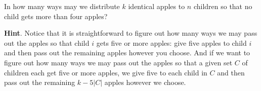 \documentclass{book}
\begin{document}
\setcounter{cpjt}{225}
\addtocounter{cpjt}{-1}
\begin{activity}\label{act_restrictedmultisetspie}
\hypertarget{p-1205}{}%
In how many ways may we distribute \(k\) identical apples to \(n\) children so that no child gets more than four apples?%
\par\smallskip%
\noindent\textbf{Hint}.\hypertarget{hint-145}{}\quad%
\hypertarget{p-1206}{}%
Notice that it is straightforward to figure out how many ways we may pass out the apples so that child \(i\) gets five or more apples: give five apples to child \(i\) and then pass out the remaining apples however you choose. And if  we want to figure out how many ways we may pass out the apples so that a given set \(C\) of children each get five or more apples, we give five to each child in \(C\) and then pass out the remaining \(k-5|C|\) apples however we choose.%
\par\smallskip%
\noindent\end{activity}

\clearpage
\end{document}
